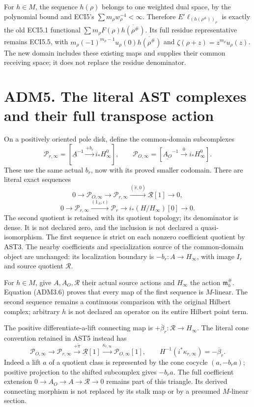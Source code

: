 For \(h\in M\), the sequence \(h(\rho)\) belongs to one weighted dual
space, by the polynomial bound and ECI5's
\(\sum m_\rho w_\rho^{-4}<\infty\). Therefore
\(E'\ell_{(h(\rho^\#))_\rho}\) is exactly the old ECI5.1 functional
\(\sum m_\rho F(\rho)\overline{h(\rho^\#)}\). Its full residue
representative remains ECI5.5, with
\(m_\rho(-1)^{m_\rho-1}u_\rho(0)\overline{h(\rho^\#)}\) and
\(\zeta(\rho+z)=z^{m_\rho}u_\rho(z)\). The new domain includes these
existing maps and supplies their common receiving space; it does not
replace the residue denominator.

\section{ADM5. The literal AST complexes and their full transpose
action}\label{adm5.-the-literal-ast-complexes-and-their-full-transpose-action}

On a positively oriented pole disk, define the common-domain
subcomplexes \[
\mathscr P_{r,\infty}=
[\underline A^{-1}\xrightarrow{+b_r}i_*H_\infty^0],\qquad
\mathscr P_{O,\infty}=
[\underline{A_O}^{-1}\xrightarrow0 i_*H_\infty^0].
\tag{ADM5.1}
\] These use the same actual \(b_r\), now with its proved smaller
codomain. There are literal exact sequences \[
0\to\mathscr P_{O,\infty}\to\mathscr P_{r,\infty}
\xrightarrow{(\widetilde\pi,0)}\underline{\mathcal R}[1]\to0,
\] \[
0\to\mathscr P_{r,\infty}\xrightarrow{(1_A,\iota)}
\mathscr P_r\to i_*(H/H_\infty)[0]\to0 .
\tag{ADM5.2}
\] The second quotient is retained with its quotient topology; its
denominator is dense. It is not declared zero, and the inclusion is not
declared a quasi-isomorphism. The first sequence is strict on each
nonzero coefficient quotient by AST3. The nearby coefficients and
specialization source of the common-domain object are unchanged: its
localization boundary is \(-b_r:A\to H_\infty\), with image \(I_r\) and
source quotient \(\mathcal R\).

For \(h\in M\), give \(A,A_O,\mathcal R\) their actual source actions
and \(H_\infty\) the action \(\mathfrak m_h^\#\). Equation (ADM3.6)
proves that every map of the first sequence is \(M\)-linear. The second
sequence remains a continuous comparison with the original Hilbert
complex; arbitrary \(h\) is not declared an operator on its entire
Hilbert point term.

The positive differentiate-a-lift connecting map is
\(+\overline\beta_r:\mathcal R\to H_\infty\). The literal cone
convention retained in AST5 instead has \[
\mathscr P_{O,\infty}\to\mathscr P_{r,\infty}
\xrightarrow{+\widetilde\pi}\underline{\mathcal R}[1]
\xrightarrow{\kappa_{r,\infty}}\mathscr P_{O,\infty}[1],
\qquad H^{-1}(i^*\kappa_{r,\infty})=-\overline\beta_r.
\tag{ADM5.3}
\] Indeed a lift \(a\) of a quotient class is represented by the cone
cocycle \((a,-b_ra)\); positive projection to the shifted subcomplex
gives \(-b_ra\). The full coefficient extension
\(0\to A_O\to A\to\mathcal R\to0\) remains part of this triangle. Its
derived connecting morphism is not replaced by its stalk map or by a
presumed \(M\)-linear section.

